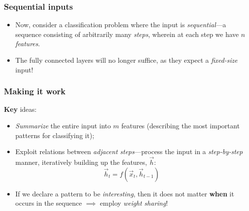 \documentclass{beamer}
\begin{document}
\begin{frame}
	\frametitle{Sequential inputs}
	\begin{itemize}
		\item Now, consider a classification problem where the input is \emph{sequential}---a sequence consisting of arbitrarily many \emph{steps}, wherein at each step we have $n$ \emph{features}.
	\end{itemize}
	\begin{center}
	\end{center}
	\begin{itemize}
		\item The fully connected layers will no longer suffice, as they expect a \emph{fixed-size} input!
	\end{itemize}
\end{frame}

\begin{frame}
	\frametitle{Making it work}
	\textbf{Key} ideas:
	\begin{itemize}
		\item \emph{Summarize} the entire input into $m$ features (describing the most important patterns for classifying it);
		\vfill
		\item Exploit relations between \emph{adjacent steps}---process the input in a \emph{step-by-step} manner, iteratively building up the features, $\vec{h}$:
		\[\vec{h}_t = f(\vec{x}_t, \vec{h}_{t-1})\]
		\vfill
		\item If we declare a pattern to be \emph{interesting}, then it does not matter \textbf{when} it occurs in the sequence $\implies$ employ \emph{weight sharing}!
	\end{itemize}
\end{frame}
\end{document}
